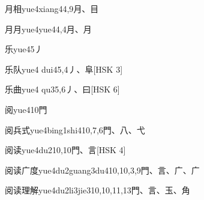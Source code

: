 \begin{EntryWithPhonetic}{月相}{yue4xiang4}{4,9}{⽉、⽬}
\end{EntryWithPhonetic}

\begin{EntryWithPhonetic}{月月}{yue4yue4}{4,4}{⽉、⽉}
\end{EntryWithPhonetic}

\begin{EntryWithPhonetic}{乐}{yue4}{5}{⼃}
\end{EntryWithPhonetic}

\begin{EntryWithPhonetic}{乐队}{yue4 dui4}{5,4}{⼃、⾩}[HSK 3]
\end{EntryWithPhonetic}

\begin{EntryWithPhonetic}{乐曲}{yue4 qu3}{5,6}{⼃、⽈}[HSK 6]
\end{EntryWithPhonetic}

\begin{EntryWithPhonetic}{阅}{yue4}{10}{⾨}
\end{EntryWithPhonetic}

\begin{EntryWithPhonetic}{阅兵式}{yue4bing1shi4}{10,7,6}{⾨、⼋、⼷}
\end{EntryWithPhonetic}

\begin{EntryWithPhonetic}{阅读}{yue4du2}{10,10}{⾨、⾔}[HSK 4]
\end{EntryWithPhonetic}

\begin{EntryWithPhonetic}{阅读广度}{yue4du2guang3du4}{10,10,3,9}{⾨、⾔、⼴、⼴}
\end{EntryWithPhonetic}

\begin{EntryWithPhonetic}{阅读理解}{yue4du2li3jie3}{10,10,11,13}{⾨、⾔、⽟、⾓}
\end{EntryWithPhonetic}

